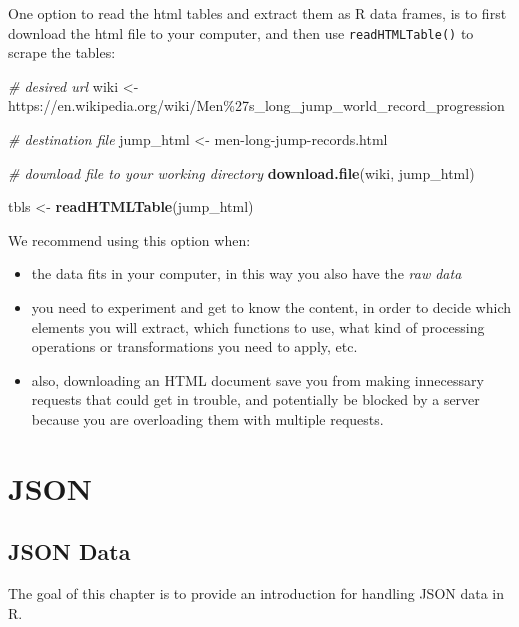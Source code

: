 \documentclass[
]{book}
\newenvironment{Shaded}{\begin{snugshade}}{\end{snugshade}}
\newcommand{\CommentTok}[1]{\textcolor[rgb]{0.56,0.35,0.01}{\textit{#1}}}
\newcommand{\FunctionTok}[1]{\textcolor[rgb]{0.13,0.29,0.53}{\textbf{#1}}}
\newcommand{\NormalTok}[1]{#1}
\newcommand{\OtherTok}[1]{\textcolor[rgb]{0.56,0.35,0.01}{#1}}
\newcommand{\StringTok}[1]{\textcolor[rgb]{0.31,0.60,0.02}{#1}}
\providecommand{\tightlist}{%
  \setlength{\itemsep}{0pt}\setlength{\parskip}{0pt}}
\begin{document}
One option to read the html tables and extract them as R data frames, is to
first download the html file to your computer, and then use \texttt{readHTMLTable()}
to scrape the tables:

\begin{Shaded}
\begin{Highlighting}[]
\CommentTok{\# desired url}
\NormalTok{wiki }\OtherTok{\textless{}{-}} \StringTok{\textquotesingle{}https://en.wikipedia.org/wiki/Men\%27s\_long\_jump\_world\_record\_progression\textquotesingle{}}

\CommentTok{\# destination file}
\NormalTok{jump\_html }\OtherTok{\textless{}{-}} \StringTok{\textquotesingle{}men{-}long{-}jump{-}records.html\textquotesingle{}}

\CommentTok{\# download file to your working directory}
\FunctionTok{download.file}\NormalTok{(wiki, jump\_html)}

\NormalTok{tbls }\OtherTok{\textless{}{-}} \FunctionTok{readHTMLTable}\NormalTok{(jump\_html)}
\end{Highlighting}
\end{Shaded}

We recommend using this option when:

\begin{itemize}
\tightlist
\item
  the data fits in your computer, in this way you also have the \emph{raw data}
\item
  you need to experiment and get to know the content, in order to decide
  which elements you will extract, which functions to use, what kind of processing
  operations or transformations you need to apply, etc.
\item
  also, downloading an HTML document save you from making innecessary requests
  that could get in trouble, and potentially be blocked by a server because you
  are overloading them with multiple requests.
\end{itemize}

\hypertarget{part-json}{%
\part{JSON}\label{part-json}}

\hypertarget{json}{%
\chapter{JSON Data}\label{json}}

The goal of this chapter is to provide an introduction for handling JSON data
in R.
\end{document}
